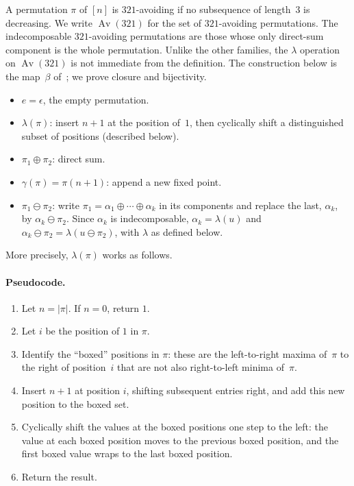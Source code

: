 \documentclass[a4paper,11pt]{article}
\theoremstyle{definition}
\DeclareMathOperator{\Av}{Av}
\begin{document}
A permutation $\pi$ of $[n]$ is $321$-avoiding if no
subsequence of length~$3$ is decreasing. We write
$\Av(321)$ for the set of $321$-avoiding permutations.
The indecomposable $321$-avoiding permutations are
those whose only direct-sum component is the whole
permutation. Unlike the other
families, the $\lambda$ operation on $\Av(321)$ is not
immediate from the definition. The construction below
is the map~$\beta$ of~\cite{CK08}; we prove closure
and bijectivity.
\begin{itemize}
\item $e = \epsilon$, the empty permutation.
\item $\lambda(\pi)$: insert $n{+}1$ at the position
  of~$1$, then cyclically shift a distinguished subset
  of positions (described below).
\item $\pi_1 \oplus \pi_2$: direct sum.
\item $\gamma(\pi) = \pi (n{+}1)$: append a new
fixed point.
\item $\pi_1 \ominus \pi_2$: write
  $\pi_1 = \alpha_1 \oplus \cdots \oplus \alpha_k$ in its
  components and replace the last, $\alpha_k$, by
  $\alpha_k \ominus \pi_2$. Since $\alpha_k$ is
  indecomposable, $\alpha_k = \lambda(u)$ and
  $\alpha_k \ominus \pi_2 = \lambda(u \ominus \pi_2)$, with
  $\lambda$ as defined below.
\end{itemize}

More precisely, $\lambda(\pi)$ works as follows.

\paragraph{Pseudocode.}
\begin{enumerate}
\item Let $n = |\pi|$. If $n = 0$, return $1$.
\item Let $i$ be the position of $1$ in $\pi$.
\item Identify the ``boxed'' positions in $\pi$: these
  are the left-to-right maxima of~$\pi$ to the right of
  position~$i$ that are not also right-to-left minima
  of~$\pi$.
\item Insert $n{+}1$ at position $i$, shifting subsequent
  entries right, and add this new position to the boxed
  set.
\item Cyclically shift the values at the boxed positions
  one step to the left: the value at each boxed position
  moves to the previous boxed position, and the first
  boxed value wraps to the last boxed position.
\item Return the result.
\end{enumerate}
\end{document}
